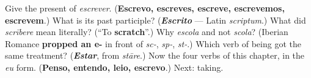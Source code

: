 \begin{tcolorbox}[breakable,colback=teal!4,colframe=teal!35!black,title={Before you move on}]
Give the present of \emph{escrever}. (\textbf{Escrevo, escreves, escreve, escrevemos, escrevem}.) What is its past participle? (\emph{\textbf{Escrito}} — Latin \emph{scriptum}.) What did \emph{scrībere} mean literally? (\textquotedblleft{}To \textbf{scratch}\textquotedblright{}.) Why \emph{escola} and not \emph{scola}? (Iberian Romance \textbf{propped an e-} in front of \emph{sc-}, \emph{sp-}, \emph{st-}.) Which verb of being got the same treatment? (\emph{\textbf{Estar}}, from \emph{stāre}.) Now the four verbs of this chapter, in the \emph{eu} form. (\textbf{Penso, entendo, leio, escrevo}.) Next: taking.
\end{tcolorbox}
